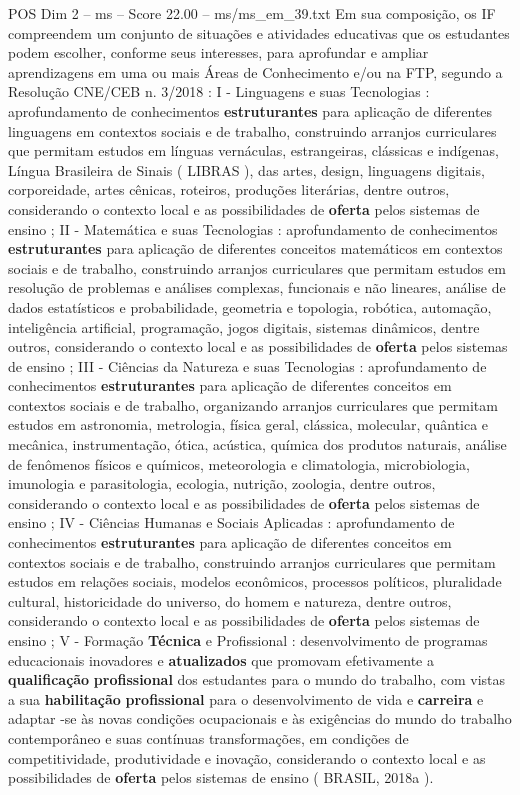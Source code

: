 \begin{textsample}{POS Dim 2 – ms – Score 22.00 – ms/ms\_em\_39.txt}
Em sua composição, os IF compreendem um conjunto de situações e atividades educativas que os estudantes podem escolher, conforme seus interesses, para aprofundar e ampliar aprendizagens em uma ou mais Áreas de Conhecimento e/ou na FTP, segundo a Resolução CNE/CEB n. 3/2018 : I - Linguagens e suas Tecnologias : aprofundamento de conhecimentos \textbf{estruturantes} para aplicação de diferentes linguagens em contextos sociais e de trabalho, construindo arranjos curriculares que permitam estudos em línguas vernáculas, estrangeiras, clássicas e indígenas, Língua Brasileira de Sinais ( LIBRAS ), das artes, design, linguagens digitais, corporeidade, artes cênicas, roteiros, produções literárias, dentre outros, considerando o contexto local e as possibilidades de \textbf{oferta} pelos sistemas de ensino ; II - Matemática e suas Tecnologias : aprofundamento de conhecimentos \textbf{estruturantes} para aplicação de diferentes conceitos matemáticos em contextos sociais e de trabalho, construindo arranjos curriculares que permitam estudos em resolução de problemas e análises complexas, funcionais e não lineares, análise de dados estatísticos e probabilidade, geometria e topologia, robótica, automação, inteligência artificial, programação, jogos digitais, sistemas dinâmicos, dentre outros, considerando o contexto local e as possibilidades de \textbf{oferta} pelos sistemas de ensino ; III - Ciências da Natureza e suas Tecnologias : aprofundamento de conhecimentos \textbf{estruturantes} para aplicação de diferentes conceitos em contextos sociais e de trabalho, organizando arranjos curriculares que permitam estudos em astronomia, metrologia, física geral, clássica, molecular, quântica e mecânica, instrumentação, ótica, acústica, química dos produtos naturais, análise de fenômenos físicos e químicos, meteorologia e climatologia, microbiologia, imunologia e parasitologia, ecologia, nutrição, zoologia, dentre outros, considerando o contexto local e as possibilidades de \textbf{oferta} pelos sistemas de ensino ; IV - Ciências Humanas e Sociais Aplicadas : aprofundamento de conhecimentos \textbf{estruturantes} para aplicação de diferentes conceitos em contextos sociais e de trabalho, construindo arranjos curriculares que permitam estudos em relações sociais, modelos econômicos, processos políticos, pluralidade cultural, historicidade do universo, do homem e natureza, dentre outros, considerando o contexto local e as possibilidades de \textbf{oferta} pelos sistemas de ensino ; V - Formação \textbf{Técnica} e Profissional : desenvolvimento de programas educacionais inovadores e \textbf{atualizados} que promovam efetivamente a \textbf{qualificação} \textbf{profissional} dos estudantes para o mundo do trabalho, com vistas a sua \textbf{habilitação} \textbf{profissional} para o desenvolvimento de vida e \textbf{carreira} e adaptar -se às novas condições ocupacionais e às exigências do mundo do trabalho contemporâneo e suas contínuas transformações, em condições de competitividade, produtividade e inovação, considerando o contexto local e as possibilidades de \textbf{oferta} pelos sistemas de ensino ( BRASIL, 2018a ).

\end{textsample}
